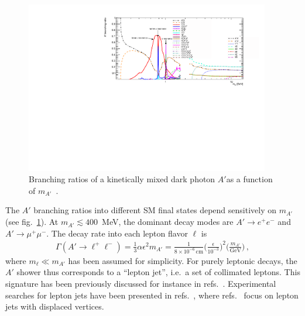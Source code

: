 \begin{enumerate}
\begin{figure}
  \begin{center}
    \includegraphics[width=0.95\textwidth]{figures/DS_DarkPhoton_BR.pdf}
  \end{center}
  \vspace{-0.7cm}
  \caption{Branching ratios of a kinetically mixed dark photon $A'$as a
    function of $m_{A'}$~\cite{Buschmann:2015awa}.}
  \label{fig:radiating-dm-BR}
\end{figure}

The $A'$ branching ratios into different SM final states depend sensitively on
$m_{A'}$ (see fig.~\ref{fig:radiating-dm-BR}).  At $m_{A'} \lesssim 400$~MeV, the dominant
decay modes are $A' \to e^+e^-$ and $A' \to \mu^+ \mu^-$. The decay
rate into each lepton flavor $\ell$ is
\begin{align}
  \Gamma(A' \to \ell^+\ell^-) =
    \frac{1}{3} \alpha \epsilon^2 m_{A'}
    = \frac{1}{8 \times 10^{-6}\,\text{cm}}
      \bigg( \frac{\epsilon}{10^{-3}} \bigg)^2
      \bigg( \frac{m_{A'}}{\text{GeV}} \bigg) \,,
\end{align}
where $m_\ell \ll m_{A'}$ has been assumed for simplicity.
For purely leptonic decays, the $A'$ shower thus corresponds to a ``lepton
jet'', i.e.\ a set of collimated leptons. This signature has been
previously discussed for instance in refs.~\cite{ArkaniHamed:2008qp,
Cheung:2009su, Katz:2009qq, Bai:2009it, Baumgart:2009tn, Chan:2011aa,
Falkowski:2010gv, Curtin:2013fra, Gupta:2015lfa, Autran:2015mfa}.
Experimental searches for lepton jets have been presented in
refs.~\cite{Aad:2014yea, Aad:2015sms, ATLAS:2016jza, Khachatryan:2015wka},
where refs.~\cite{Aad:2014yea, ATLAS:2016jza} focus on lepton jets with
displaced vertices.


\end{enumerate}
